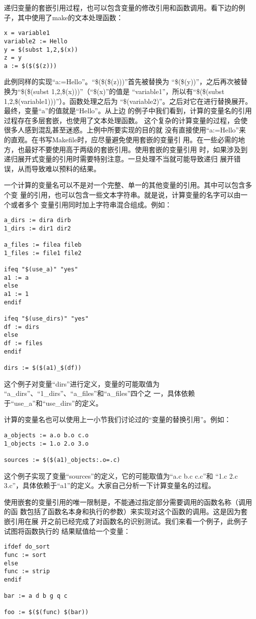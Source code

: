 递归变量的套嵌引用过程，也可以包含变量的修改引用和函数调用。看下边的例子，其中使用了make的文本处理函数：
\begin{Verbatim}[]
x = variable1
variable2 := Hello
y = $(subst 1,2,$(x))
z = y
a := $($($(z)))
\end{Verbatim}

此例同样的实现“a:=Hello”。“\$(\$(\$(z)))”首先被替换为
“\$(\$(y))”，之后再次被替换为“\$(\$(su\-bst 1,2,\$(x)))”（“\$(x)”的值是
“variable1”，所以有“\$(\$(subst 1,2,\$(variable1)))”）。函数处理之后为
“\$(variable2)”。之后对它在进行替换展开。最终，变量“a”的值就是“Hello”。从上边
的例子中我们看到，计算的变量名的引用过程存在多层套嵌，也使用了文本处理函数。
这个复杂的计算变量的过程，会使很多人感到混乱甚至迷惑。上例中所要实现的目的就
没有直接使用“a:=Hello”来的直观。在书写Makefile时，应尽量避免使用套嵌的变量引
用。在一些必需的地方，也最好不要使用高于两级的套嵌引用。使用套嵌的变量引用
时，如果涉及到递归展开式变量的引用时需要特别注意。一旦处理不当就可能导致递归
展开错误，从而导致难以预料的结果。

一个计算的变量名可以不是对一个完整、单一的其他变量的引用。其中可以包含多个变
量的引用，也可以包含一些文本字符串。就是说，计算变量的名字可以由一个或者多个
变量引用同时加上字符串混合组成。例如：

\begin{Verbatim}[]
a_dirs := dira dirb
1_dirs := dir1 dir2

a_files := filea fileb
1_files := file1 file2

ifeq "$(use_a)" "yes"
a1 := a
else
a1 := 1
endif

ifeq "$(use_dirs)" "yes"
df := dirs
else
df := files
endif

dirs := $($(a1)_$(df))
\end{Verbatim}

这个例子对变量“dirs”进行定义，变量的可能取值为
“a\_dirs”、“1\_dirs”、“a\_files”和“a\_files”四个之
一，具体依赖于“use\_a”和“use\_dirs”的定义。

计算的变量名也可以使用上一小节我们讨论过的“变量的替换引用”。例如：
\begin{Verbatim}[]
a_objects := a.o b.o c.o
1_objects := 1.o 2.o 3.o

sources := $($(a1)_objects:.o=.c)
\end{Verbatim}

这个例子实现了变量“sources”的定义，它的可能取值为“a.c b.c c.c”和%
“1.c 2.c 3.c”，具体依赖于“a1”的定义。大家自己分析一下计算变量名的过程。

使用嵌套的变量引用的唯一限制是，不能通过指定部分需要调用的函数名称（调用的函
数包括了函数名本身和执行的参数）来实现对这个函数的调用。这是因为套嵌引用在展
开之前已经完成了对函数名的识别测试。我们来看一个例子，此例子试图将函数执行的
结果赋值给一个变量：
\begin{Verbatim}[]
ifdef do_sort
func := sort
else
func := strip
endif

bar := a d b g q c

foo := $($(func) $(bar))
\end{Verbatim}

